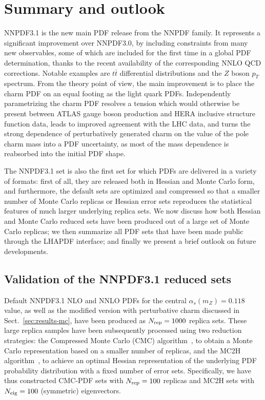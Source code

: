 \section{Summary and outlook}
\label{sec:conclusion}
NNPDF3.1  is the new main PDF release from the
NNPDF family.
%
It represents a significant improvement over
NNPDF3.0, by including constraints from many new observables,
some of which are included for the first time in a global
PDF determination,  thanks to the recent availability of the corresponding
NNLO QCD corrections. Notable examples are $t\bar{t}$ differential distributions
and the $Z$ boson $p_T$ spectrum.
%
From the theory point of view,
the main improvement is to place the charm
PDF on an equal footing as the light quark
PDFs.
%
Independently parametrizing  the charm PDF  resolves a tension which would otherwise be present
between ATLAS gauge boson production and HERA inclusive structure
function data, leads to improved agreement with the 
LHC data, and turns the strong dependence of perturbatively
generated charm on the value of the pole charm mass into a PDF
uncertainty, as most of the mass dependence is reabsorbed into the initial
PDF shape. 

The NNPDF3.1 set is also the first set for which PDFs are delivered in a
variety of formats: first of all, they are released both in Hessian
and Monte Carlo form, and furthermore, the default sets are optimized
and compressed so that a smaller number of  
Monte Carlo replicas or Hessian error sets reproduces the statistical
features of much larger underlying replica sets.
We now   discuss how both Hessian and Monte
Carlo reduced sets have
been produced out of a large set of Monte Carlo
replicas;  we then summarize all PDF sets that have been made public
through the LHAPDF interface; and  finally  we
present a brief outlook on future developments.

\subsection{Validation of the NNPDF3.1 reduced sets}
\label{sec:compression}

  Default NNPDF3.1 NLO and NNLO PDFs for the central
  $\alpha_s(m_Z)=0.118$ value, as well as the modified version with
  perturbative charm discussed in Sect.~\ref{sec:results-mc}, have been produced as  $N_{\rm
    rep}=1000$ replica sets. These large replica samples have been
subsequently processed using two reduction
  strategies: the Compressed Monte Carlo (CMC) algorithm~\cite{Carrazza:2015hva},
  to obtain
  a Monte Carlo representation based on a smaller number of replicas,
  and the  MC2H algorithm~\cite{Carrazza:2015aoa},
  to achieve an optimal Hessian representation
  of the underlying PDF probability distribution with a fixed number
  of error sets. Specifically,  we have thus constructed
  CMC-PDF sets with $N_{\rm rep}=100$ replicas and
  MC2H sets with $N_{\rm eig}=100$ (symmetric) eigenvectors.

